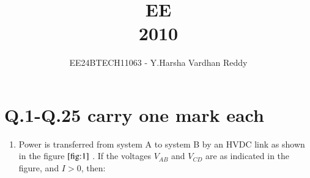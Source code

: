 \documentclass[journal]{IEEEtran}
\renewcommand{\thefigure}{\theenumi}
\renewcommand{\thetable}{\theenumi}
\numberwithin{equation}{enumi}
\numberwithin{figure}{enumi}
\renewcommand{\thetable}{\theenumi}
\begin{document}

\vspace{3cm}

\title{EE\\2010}
\author{EE24BTECH11063 - Y.Harsha Vardhan Reddy}
\maketitle

\bigskip

\renewcommand{\thefigure}{\theenumi}
\renewcommand{\thetable}{\theenumi}

\section*{Q.1-Q.25 carry one mark each}

    \begin{enumerate}
    \item Power is transferred from system A to system B by an HVDC link as shown in the figure $\ref{fig:1}$ . If the voltages $V_{AB}$ and $V_{CD}$ are as indicated in the figure, and $I > 0$, then:
    	\begin{figure}[!ht]
			\centering
\end{figure}
\end{enumerate}
\end{document}
